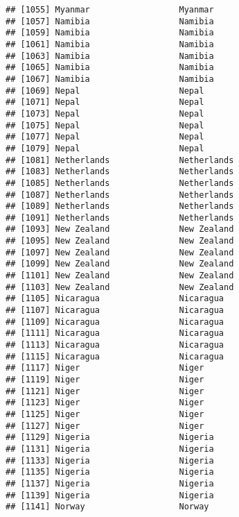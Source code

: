\documentclass[]{article}
\begin{document}
\begin{verbatim}
## [1055] Myanmar                  Myanmar                 
## [1057] Namibia                  Namibia                 
## [1059] Namibia                  Namibia                 
## [1061] Namibia                  Namibia                 
## [1063] Namibia                  Namibia                 
## [1065] Namibia                  Namibia                 
## [1067] Namibia                  Namibia                 
## [1069] Nepal                    Nepal                   
## [1071] Nepal                    Nepal                   
## [1073] Nepal                    Nepal                   
## [1075] Nepal                    Nepal                   
## [1077] Nepal                    Nepal                   
## [1079] Nepal                    Nepal                   
## [1081] Netherlands              Netherlands             
## [1083] Netherlands              Netherlands             
## [1085] Netherlands              Netherlands             
## [1087] Netherlands              Netherlands             
## [1089] Netherlands              Netherlands             
## [1091] Netherlands              Netherlands             
## [1093] New Zealand              New Zealand             
## [1095] New Zealand              New Zealand             
## [1097] New Zealand              New Zealand             
## [1099] New Zealand              New Zealand             
## [1101] New Zealand              New Zealand             
## [1103] New Zealand              New Zealand             
## [1105] Nicaragua                Nicaragua               
## [1107] Nicaragua                Nicaragua               
## [1109] Nicaragua                Nicaragua               
## [1111] Nicaragua                Nicaragua               
## [1113] Nicaragua                Nicaragua               
## [1115] Nicaragua                Nicaragua               
## [1117] Niger                    Niger                   
## [1119] Niger                    Niger                   
## [1121] Niger                    Niger                   
## [1123] Niger                    Niger                   
## [1125] Niger                    Niger                   
## [1127] Niger                    Niger                   
## [1129] Nigeria                  Nigeria                 
## [1131] Nigeria                  Nigeria                 
## [1133] Nigeria                  Nigeria                 
## [1135] Nigeria                  Nigeria                 
## [1137] Nigeria                  Nigeria                 
## [1139] Nigeria                  Nigeria                 
## [1141] Norway                   Norway                  

\end{verbatim}
\end{document}
